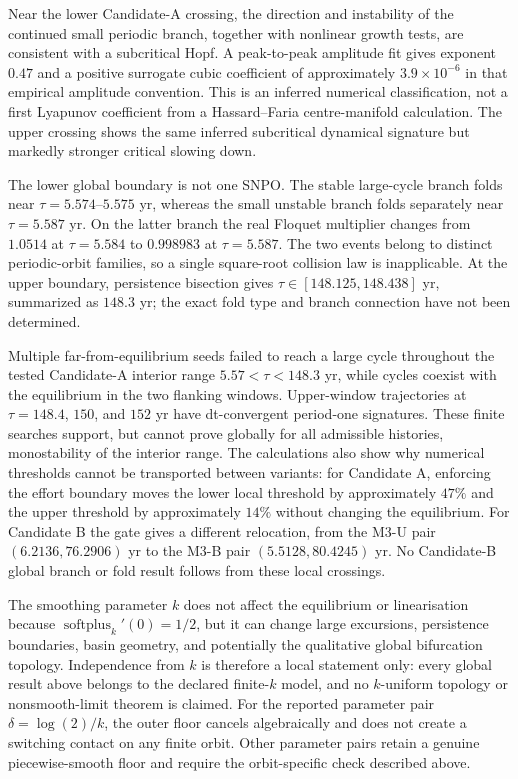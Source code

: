 \documentclass[11pt]{article}
\newcommand{\spx}{\operatorname{softplus}}
\begin{document}
Near the lower Candidate-A crossing, the direction and instability of the continued small periodic branch, together with nonlinear growth tests, are consistent with a subcritical Hopf. A peak-to-peak amplitude fit gives exponent $0.47$ and a positive surrogate cubic coefficient of approximately $3.9\times10^{-6}$ in that empirical amplitude convention. This is an inferred numerical classification, not a first Lyapunov coefficient from a Hassard--Faria centre-manifold calculation. The upper crossing shows the same inferred subcritical dynamical signature but markedly stronger critical slowing down.

The lower global boundary is not one SNPO. The stable large-cycle branch folds near $\tau=5.574$--$5.575$ yr, whereas the small unstable branch folds separately near $\tau=5.587$ yr. On the latter branch the real Floquet multiplier changes from $1.0514$ at $\tau=5.584$ to $0.998983$ at $\tau=5.587$. The two events belong to distinct periodic-orbit families, so a single square-root collision law is inapplicable. At the upper boundary, persistence bisection gives $\tau\in[148.125,148.438]$ yr, summarized as $148.3$ yr; the exact fold type and branch connection have not been determined.

Multiple far-from-equilibrium seeds failed to reach a large cycle throughout the tested Candidate-A interior range $5.57<\tau<148.3$ yr, while cycles coexist with the equilibrium in the two flanking windows. Upper-window trajectories at $\tau=148.4$, $150$, and $152$ yr have dt-convergent period-one signatures. These finite searches support, but cannot prove globally for all admissible histories, monostability of the interior range. The calculations also show why numerical thresholds cannot be transported between variants: for Candidate A, enforcing the effort boundary moves the lower local threshold by approximately $47\%$ and the upper threshold by approximately $14\%$ without changing the equilibrium. For Candidate B the gate gives a different relocation, from the M3-U pair $(6.2136,76.2906)$ yr to the M3-B pair $(5.5128,80.4245)$ yr. No Candidate-B global branch or fold result follows from these local crossings.

The smoothing parameter $k$ does not affect the equilibrium or linearisation because $\spx_k'(0)=1/2$, but it can change large excursions, persistence boundaries, basin geometry, and potentially the qualitative global bifurcation topology. Independence from $k$ is therefore a local statement only: every global result above belongs to the declared finite-$k$ model, and no $k$-uniform topology or nonsmooth-limit theorem is claimed. For the reported parameter pair $\delta=\log(2)/k$, the outer floor cancels algebraically and does not create a switching contact on any finite orbit. Other parameter pairs retain a genuine piecewise-smooth floor and require the orbit-specific check described above.
\end{document}

